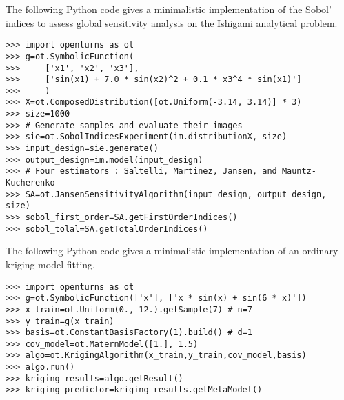 \begin{otexample}
    The following Python code gives a minimalistic \ot implementation of the Sobol' indices to assess global sensitivity analysis on the Ishigami analytical problem. 
    \lstset{style=mystyle, language=python}
%
\begin{lstlisting}
>>> import openturns as ot
>>> g=ot.SymbolicFunction(
>>>     ['x1', 'x2', 'x3'], 
>>>     ['sin(x1) + 7.0 * sin(x2)^2 + 0.1 * x3^4 * sin(x1)']
>>>     )
>>> X=ot.ComposedDistribution([ot.Uniform(-3.14, 3.14)] * 3)
>>> size=1000
>>> # Generate samples and evaluate their images
>>> sie=ot.SobolIndicesExperiment(im.distributionX, size)
>>> input_design=sie.generate()
>>> output_design=im.model(input_design)
>>> # Four estimators : Saltelli, Martinez, Jansen, and Mauntz-Kucherenko
>>> SA=ot.JansenSensitivityAlgorithm(input_design, output_design, size)
>>> sobol_first_order=SA.getFirstOrderIndices()
>>> sobol_tolal=SA.getTotalOrderIndices()
\end{lstlisting}
%
\end{otexample}



\begin{otexample}
    The following Python code gives a minimalistic \ot implementation of an ordinary kriging model fitting. 
    \lstset{style=mystyle, language=python}
%
\begin{lstlisting}
>>> import openturns as ot
>>> g=ot.SymbolicFunction(['x'], ['x * sin(x) + sin(6 * x)'])
>>> x_train=ot.Uniform(0., 12.).getSample(7) # n=7
>>> y_train=g(x_train)
>>> basis=ot.ConstantBasisFactory(1).build() # d=1
>>> cov_model=ot.MaternModel([1.], 1.5)
>>> algo=ot.KrigingAlgorithm(x_train,y_train,cov_model,basis)
>>> algo.run()
>>> kriging_results=algo.getResult()
>>> kriging_predictor=kriging_results.getMetaModel()
\end{lstlisting}
%
\end{otexample}
